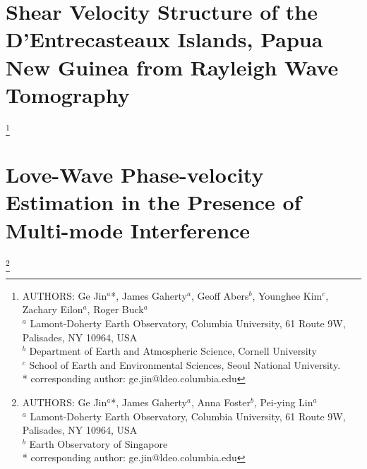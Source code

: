 \documentclass[12pt,oneside]{book}
\begin{document}

\singlespacing
\chapter[Shear velocity structure of the DI, PNG]{Shear Velocity Structure of the D'Entrecasteaux Islands, Papua New Guinea from Rayleigh Wave Tomography}
\label{ch:png}
\doublespacing

\thispagestyle{fancy}
\begin{raggedright}
\footnote{AUTHORS:  Ge Jin$^a$*,  James Gaherty$^a$, Geoff Abers$^b$, Younghee Kim$^c$, Zachary Eilon$^a$, Roger Buck$^a$\\
$^a$ Lamont-Doherty Earth Observatory, Columbia University, 61 Route 9W, Palisades, NY 10964, USA\\
$^b$ Department of Earth and Atmospheric Science, Cornell University\\
$^c$ School of Earth and Environmental Sciences, Seoul National University.\\
* corresponding author: ge.jin@ldeo.columbia.edu}
\end{raggedright}
\normalsize





\singlespacing
\chapter[Love-wave Overtone Interference]{Love-Wave Phase-velocity Estimation in the Presence of Multi-mode Interference}
\label{ch:overtone}
\doublespacing

\thispagestyle{fancy}
\begin{raggedright}
\footnote{AUTHORS:  Ge Jin$^a$*,  James Gaherty$^a$, Anna Foster$^b$, Pei-ying Lin$^a$\\
$^a$ Lamont-Doherty Earth Observatory, Columbia University, 61 Route 9W, Palisades, NY 10964, USA\\
$^b$ Earth Observatory of Singapore\\
* corresponding author: ge.jin@ldeo.columbia.edu}
\end{raggedright}
\normalsize



\singlespacing
\end{document}
